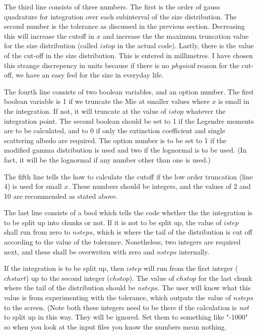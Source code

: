 \documentclass[12pt]{article}
\begin{document}
\begin{flushleft}
The third line consists of three numbers. The first is the order of gauss quadrature
for integration over each subinterval of the size distribution. The second
 number is the tolerance as 
discussed in the previous section. Decreasing this will increase the cutoff in $x$
and increase the the maximum truncation value for the size distribution (called $istop$
in the actual code). Lastly, there is the value of the cut-off in the size distribution.
This is entered in millimetres. I have chosen this strange discrepency in units
because if there is no {\it physical} reason for the cut-off, we have an easy feel
for the size in everyday life.
 

The fourth line consists of two boolean variables, and an option number.
 The first  boolean variable is 1 if
we truncate the Mie at smaller values where  $x$ is small in the integration.
If not, it will truncate at the value of $istop$ whatever the integration point.
The second boolean should be set to 1 if the Legendre moments are to be calculated,
and to 0 if only the extinction coefficient and single scattering albedo are required.
The option number is to be set to 1 if the modified gamma distribution is used
and two if the lognormal is to be used. (In fact, it will be the lognormal if
any number other than one is used.)

The fifth line tells the  how to calculate the cutoff if
the low order truncation (line 4) is used for small $x$. These numbers should be 
integers, and the values of 2 and 10 are recommended as stated above.

The last line consists of a bool which tells the code whether the the integration
is to be split up into chunks or not. If it is not to be split up, the value
of $istep$ shall run from zero to $nsteps$, which is where the tail of the 
distribution
is cut off according to the value of the tolerance. Nonetheless, two integers are
required next, and these shall be overwriten with zero and $nsteps$ internally.

If the integration is to be split up, then $istep$ will run from the first integer
($chstart$) up to the second integer ($chstop$). The value of $chstop$ for the
last chunk where the tail of the distribution should be $nsteps$. The user will
know what this value is from experimenting with the tolerance, which outputs
the value of $nsteps$ to the screen. (Note both these integers need to be
there if the calculation is {\it not} to split up in this way. They will be
ignored. Set them to something like "-1000" so when you look at the input files
you know the numbers mean nothing.


\end{flushleft}
\end{document}
